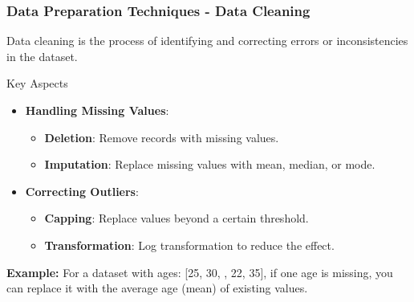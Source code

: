\documentclass{beamer}
\begin{document}
\begin{frame}[fragile]
    \frametitle{Data Preparation Techniques - Data Cleaning}
    Data cleaning is the process of identifying and correcting errors or inconsistencies in the dataset.
    
    \begin{block}{Key Aspects}
        \begin{itemize}
            \item \textbf{Handling Missing Values}:
            \begin{itemize}
                \item \textbf{Deletion}: Remove records with missing values.
                \item \textbf{Imputation}: Replace missing values with mean, median, or mode.
            \end{itemize}
            \item \textbf{Correcting Outliers}:
            \begin{itemize}
                \item \textbf{Capping}: Replace values beyond a certain threshold.
                \item \textbf{Transformation}: Log transformation to reduce the effect.
            \end{itemize}
        \end{itemize}
    \end{block}
    
    \textbf{Example:} For a dataset with ages: [25, 30, , 22, 35], if one age is missing, you can replace it with the average age (mean) of existing values.
\end{frame}
\end{document}
